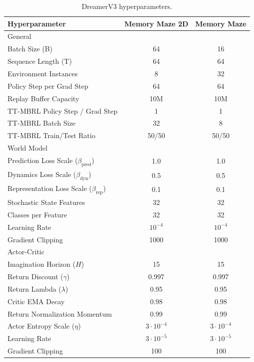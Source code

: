 \begin{table}[!ht]
\caption{DreamerV3 hyperparameters.}
\setlength{\tabcolsep}{20pt}
\renewcommand{\arraystretch}{1.25}
\centering
\hfill \break
\begin{tabular}{lcc}
\toprule
Hyperparameter & Memory Maze 2D & Memory Maze \\ 
\midrule
General & \\
Batch Size (B) & 64 & 16 \\
Sequence Length (T) & 64 & 64 \\
Environment Instances & 8 & 32 \\
Policy Step per Grad Step & 64 & 64 \\
Replay Buffer Capacity & 10M & 10M \\
TT-MBRL Policy Step / Grad Step & 1 & 1 \\
TT-MBRL Batch Size & 32 & 8 \\
TT-MBRL Train/Test Ratio & 50/50 & 50/50 \\
\midrule
World Model & \\
Prediction Loss Scale ($\beta_{\text{pred}}$) & 1.0 & 1.0 \\
Dynamics Loss Scale ($\beta_{\text{dyn}}$) & 0.5 & 0.5 \\
Representation Loss Scale ($\beta_{\text{rep}}$) & 0.1 & 0.1\\
Stochastic State Features & 32 & 32\\
Classes per Feature & 32 & 32\\
Learning Rate & $10^{-4}$ & $10^{-4}$\\
Gradient Clipping & 1000 & 1000 \\
\midrule
Actor-Critic & \\
Imagination Horizon ($H$) & 15 & 15\\
Return Discount ($\gamma$) & 0.997 & 0.997\\
Return Lambda ($\lambda$) & 0.95 & 0.95\\
Critic EMA Decay & 0.98 & 0.98 \\
Return Normalization Momentum & 0.99 & 0.99 \\
Actor Entropy Scale ($\eta$) & $3 \cdot 10^{-4}$ & $3 \cdot 10^{-4}$\\
Learning Rate & $3 \cdot 10^{-5}$ & $3 \cdot 10^{-5}$\\
Gradient Clipping & 100 & 100 \\
\bottomrule
\end{tabular}
\label{table:hyperparams_dv3}
\end{table}

